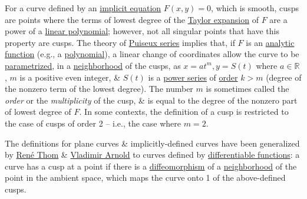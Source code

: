 \documentclass{article}
\begin{document}
For a curve defined by an \href{https://en.wikipedia.org/wiki/Implicit_equation}{implicit equation} $F(x,y) = 0$, which is smooth, cusps are points where the terms of lowest degree of the \href{https://en.wikipedia.org/wiki/Taylor_expansion}{Taylor expansion} of $F$ are a power of a \href{https://en.wikipedia.org/wiki/Linear_polynomial}{linear polynomial}; however, not all singular points that have this property are cusps. The theory of \href{https://en.wikipedia.org/wiki/Puiseux_series}{Puiseux series} implies that, if $F$ is an \href{https://en.wikipedia.org/wiki/Analytic_function}{analytic function} (e.g., a \href{https://en.wikipedia.org/wiki/Polynomial}{polynomial}), a linear change of coordinates allow the curve to be \href{https://en.wikipedia.org/wiki/Parametrization_(geometry)}{parametrized}, in a \href{https://en.wikipedia.org/wiki/Neighbourhood_(mathematics)}{neighborhood} of the cusps, as $x = at^m,y = S(t)$ where $a\in\mathbb{R}$, $m$ is a positive even integer, \& $S(t)$ is a \href{https://en.wikipedia.org/wiki/Power_series}{power series} of \href{https://en.wikipedia.org/wiki/Power_series#Order_of_a_power_series}{order} $k > m$ (degree of the nonzero term of the lowest degree). The number $m$ is sometimes called the {\it order} or the {\it multiplicity} of the cusp, \& is equal to the degree of the nonzero part of lowest degree of $F$. In some contexts, the definition of a cusp is restricted to the case of cusps of order 2 -- i.e., the case where $m = 2$.

The definitions for plane curves \& implicitly-defined curves have been generalized by \href{https://en.wikipedia.org/wiki/Ren%C3%A9_Thom}{\sc Ren\'e Thom} \& \href{https://en.wikipedia.org/wiki/Vladimir_Arnold}{\sc Vladimir Arnold} to curves defined by \href{https://en.wikipedia.org/wiki/Differentiable_function}{differentiable functions}: a curve has a cusp at a point if there is a \href{https://en.wikipedia.org/wiki/Diffeomorphism}{diffeomorphism} of a \href{https://en.wikipedia.org/wiki/Neighborhood_(topology)}{neighborhood} of the point in the ambient space, which maps the curve onto 1 of the above-defined cusps.
\end{document}
